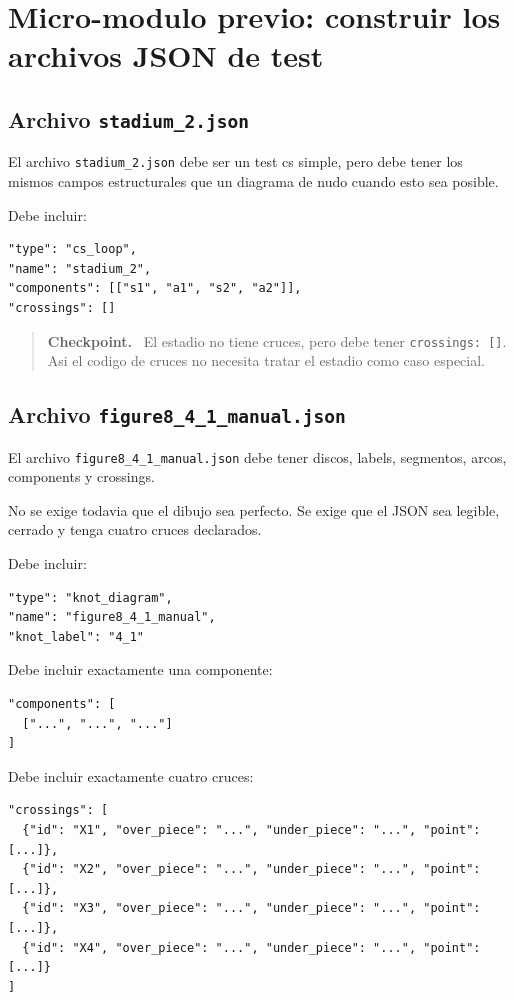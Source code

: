 \documentclass[11pt,letterpaper]{amsart}
\newenvironment{checkpoint}
{\par\medskip\noindent\begin{quote}\textbf{Checkpoint.}\ }
{\end{quote}\par\medskip}
\begin{document}
\section{Micro-modulo previo: construir los archivos JSON de test}

\subsection{Archivo \texttt{stadium\_2.json}}

El archivo \texttt{stadium\_2.json} debe ser un test cs simple, pero debe tener
los mismos campos estructurales que un diagrama de nudo cuando esto sea posible.

Debe incluir:

\begin{verbatim}
"type": "cs_loop",
"name": "stadium_2",
"components": [["s1", "a1", "s2", "a2"]],
"crossings": []
\end{verbatim}

\begin{checkpoint}
El estadio no tiene cruces, pero debe tener \texttt{crossings: []}. Asi el
codigo de cruces no necesita tratar el estadio como caso especial.
\end{checkpoint}

\subsection{Archivo \texttt{figure8\_4\_1\_manual.json}}

El archivo \texttt{figure8\_4\_1\_manual.json} debe tener discos, labels,
segmentos, arcos, components y crossings.

No se exige todavia que el dibujo sea perfecto. Se exige que el JSON sea
legible, cerrado y tenga cuatro cruces declarados.

Debe incluir:

\begin{verbatim}
"type": "knot_diagram",
"name": "figure8_4_1_manual",
"knot_label": "4_1"
\end{verbatim}

Debe incluir exactamente una componente:

\begin{verbatim}
"components": [
  ["...", "...", "..."]
]
\end{verbatim}

Debe incluir exactamente cuatro cruces:

\begin{verbatim}
"crossings": [
  {"id": "X1", "over_piece": "...", "under_piece": "...", "point": [...]},
  {"id": "X2", "over_piece": "...", "under_piece": "...", "point": [...]},
  {"id": "X3", "over_piece": "...", "under_piece": "...", "point": [...]},
  {"id": "X4", "over_piece": "...", "under_piece": "...", "point": [...]}
]
\end{verbatim}
\end{document}
